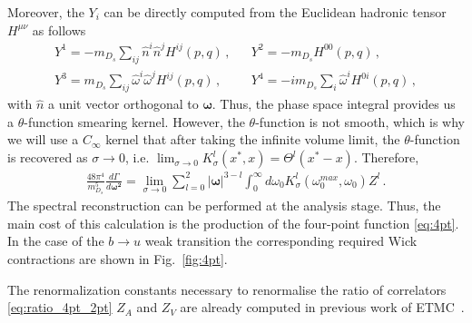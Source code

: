 Moreover, the $Y_i$ can be directly computed from the Euclidean
hadronic tensor $H^{\mu\nu}$ as follows
\begin{align}
                                                     & Y^1=-m_{D_s}\sum_{ij}\hat{n}^i\hat{n}^j H^{ij}(p,q)\,,          &  & Y^2=-m_{D_s}H^{00}(p,q)\,, \\
                                                     & Y^3=m_{D_s}\sum_{ij}\hat{\omega}^i\hat{\omega}^j H^{ij}(p,q)\,, &  &
  Y^4=-im_{D_s}\sum_{i}\hat{\omega}^i H^{0i}(p,q)\,, &
\end{align}
with $\hat{n}$ a unit vector orthogonal to $\bm\omega$.
Thus, the phase space integral provides us a $\theta$-function smearing
kernel. However, the $\theta$-function is not smooth, which is why we
will use a $C_\infty$ kernel that
after taking the infinite volume limit, the
$\theta$-function is recovered as $\sigma\to0$, i.e. $\lim_{\sigma\to 0} K_\sigma^l(x^*,x)=\Theta^l(x^*-x)$.
Therefore,
\begin{gather}
  \frac{48 \pi^4}{m_{D_s}^5}\frac{d\Gamma}{d \bm{ \omega^2} }
  =\lim_{\sigma\to 0}\sum_{l=0}^2 |\bm{\omega}|^{3-l}\int_0^{\infty}d \omega_0 K_\sigma^l(\omega_0^{max},\omega_0) Z^l\,.
\end{gather}
The spectral reconstruction can be performed at the analysis stage. Thus,
the main cost of this calculation is the production of the
four-point function \eqref{eq:4pt}. In the case of the $b\to u$ weak
transition the corresponding required Wick contractions are shown in
Fig.~\ref{fig:4pt}.

The renormalization constants necessary to renormalise the ratio of
correlators \eqref{eq:ratio_4pt_2pt} $Z_A$ and $Z_V$ are already
computed in previous work of ETMC~\cite{ExtendedTwistedMass:2022jpw}.

